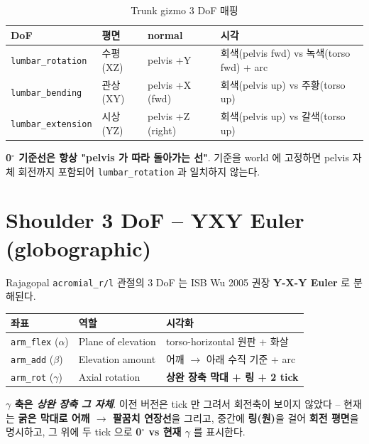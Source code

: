 \documentclass[11pt, a4paper]{report}
\begin{document}
\begin{table}[h!]
\centering
\caption{Trunk gizmo 3 DoF 매핑}
\begin{tabular}{l|l|l|l}
\toprule
\textbf{DoF} & \textbf{평면} & \textbf{normal} & \textbf{시각} \\
\midrule
\texttt{lumbar\_rotation} & 수평(XZ) & pelvis +Y & 회색(pelvis fwd) vs 녹색(torso fwd) + arc \\
\texttt{lumbar\_bending} & 관상(XY) & pelvis +X (fwd) & 회색(pelvis up) vs 주황(torso up) \\
\texttt{lumbar\_extension} & 시상(YZ) & pelvis +Z (right) & 회색(pelvis up) vs 갈색(torso up) \\
\bottomrule
\end{tabular}
\end{table}

\begin{keyidea}
\textbf{0$^\circ$ 기준선은 항상 "pelvis 가 따라 돌아가는 선"}.
기준을 world 에 고정하면 pelvis 자체 회전까지 포함되어
\texttt{lumbar\_rotation} 과 일치하지 않는다.
\end{keyidea}

\section{Shoulder 3 DoF -- YXY Euler (globographic)}

Rajagopal \texttt{acromial\_r/l} 관절의 3 DoF 는 ISB Wu 2005 권장
\textbf{Y-X-Y Euler} 로 분해된다.

\begin{center}
\begin{tabular}{l|l|l}
\toprule
\textbf{좌표} & \textbf{역할} & \textbf{시각화} \\
\midrule
\texttt{arm\_flex} ($\alpha$) & Plane of elevation & torso-horizontal 원판 + 화살 \\
\texttt{arm\_add} ($\beta$) & Elevation amount & 어깨 $\to$ 아래 수직 기준 + arc \\
\texttt{arm\_rot} ($\gamma$) & Axial rotation & \textbf{상완 장축 막대 + 링 + 2 tick} \\
\bottomrule
\end{tabular}
\end{center}

\begin{warningbox}
\textbf{$\gamma$ 축은 \emph{상완 장축 그 자체}}. 이전 버전은 tick 만
그려서 회전축이 보이지 않았다 -- 현재는 \textbf{굵은 막대로
어깨 $\to$ 팔꿈치 연장선}을 그리고, 중간에 \textbf{링(원)}을 걸어
\textbf{회전 평면}을 명시하고, 그 위에 두 tick 으로
\textbf{0$^\circ$ vs 현재 $\gamma$} 를 표시한다.
\end{warningbox}
\end{document}
